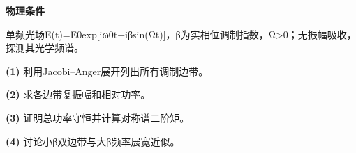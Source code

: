 \textbf{物理条件}\par 单频光场E(t)=E0exp[iω0t+iβsin(Ωt)]，β为实相位调制指数，Ω>0；无振幅吸收，探测其光学频谱。
\par\noindent\textbf{(1)} 利用Jacobi–Anger展开列出所有调制边带。
\par\noindent\textbf{(2)} 求各边带复振幅和相对功率。
\par\noindent\textbf{(3)} 证明总功率守恒并计算对称谱二阶矩。
\par\noindent\textbf{(4)} 讨论小β双边带与大β频率展宽近似。
